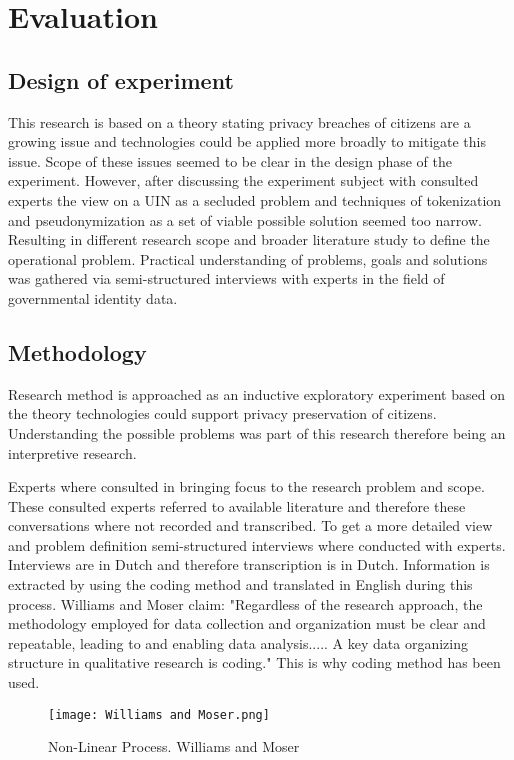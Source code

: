 \chapter{Evaluation}\label{s:evaluation}

\section{Design of experiment}
This research is based on a theory stating privacy breaches of citizens are a growing issue and technologies could be applied more broadly to mitigate this issue. Scope of these issues seemed to be clear in the design phase of the experiment. However, after discussing the experiment subject with consulted experts the view on a UIN as a secluded problem and techniques of tokenization and pseudonymization as a set of viable possible solution seemed too narrow. Resulting in different research scope and broader literature study to define the operational problem. Practical understanding of problems, goals and solutions was gathered via semi-structured interviews with experts in the field of governmental identity data.

\section{Methodology}
Research method is approached as an inductive exploratory experiment based on the theory technologies could support privacy preservation of citizens. Understanding the possible problems was part of this research therefore being an interpretive research.

Experts where consulted in bringing focus to the research problem and scope. These consulted experts referred to available literature and therefore these conversations where not recorded and transcribed. To get a more detailed view and problem definition semi-structured interviews where conducted with experts. Interviews are in Dutch and therefore transcription is in Dutch. Information is extracted by using the coding method and translated in English during this process. Williams and Moser \cite{Williams2019TheAO} claim: "Regardless of the research approach, the methodology employed for data collection and
organization must be clear and repeatable, leading to and enabling data analysis..... A key data organizing structure in qualitative research is coding." This is why coding method has been used. 

    \begin{figure}
        \graphicspath{ {./images/} }
        \centering
        \texttt{[image: Williams and Moser.png]}\\
        \caption{Non-Linear Process. Williams and Moser \cite{Williams2019TheAO}}
        \label{fig:WM2019}
    \end{figure}

